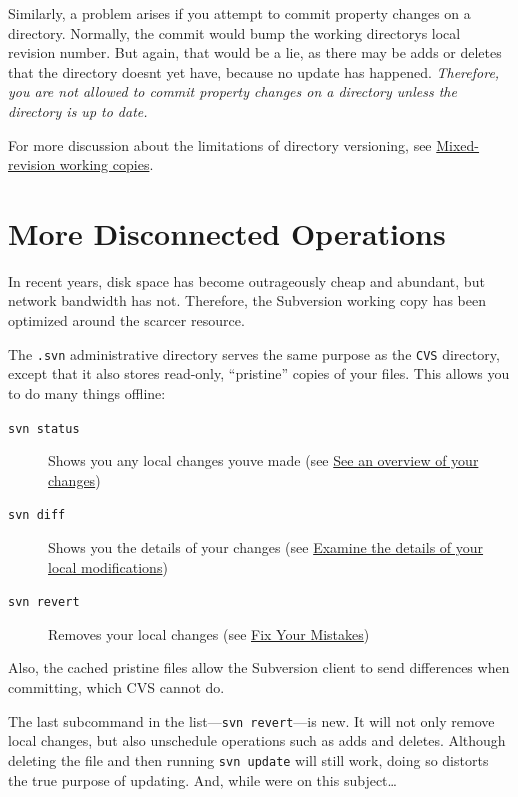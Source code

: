 Similarly, a problem arises if you attempt to commit property changes on
a directory. Normally, the commit would bump the working
directory\textquotesingle s local revision number. But again, that would
be a lie, as there may be adds or deletes that the directory
doesn\textquotesingle t yet have, because no update has happened.
\emph{Therefore, you are not allowed to commit property changes on a
directory unless the directory is up to date.}

For more discussion about the limitations of directory versioning, see
\hyperref[svn.basic.in-action.mixedrevs]{Mixed-revision working copies}.

\section{More Disconnected Operations}\label{svn.forcvs.disconnected}

In recent years, disk space has become outrageously cheap and abundant,
but network bandwidth has not. Therefore, the Subversion working copy
has been optimized around the scarcer resource.

The \texttt{.svn} administrative directory serves the same purpose as
the \texttt{CVS} directory, except that it also stores read-only,
``pristine'' copies of your files. This allows you to do many things
offline:

\begin{description}
\item[\texttt{svn\ status}]
Shows you any local changes you\textquotesingle ve made (see
\hyperref[svn.tour.cycle.examine.status]{See an overview of your
changes})
\item[\texttt{svn\ diff}]
Shows you the details of your changes (see
\hyperref[svn.tour.cycle.examine.diff]{Examine the details of your local
modifications})
\item[\texttt{svn\ revert}]
Removes your local changes (see \hyperref[svn.tour.cycle.revert]{Fix
Your Mistakes})
\end{description}

Also, the cached pristine files allow the Subversion client to send
differences when committing, which CVS cannot do.

The last subcommand in the list---\texttt{svn\ revert}---is new. It will
not only remove local changes, but also unschedule operations such as
adds and deletes. Although deleting the file and then running
\texttt{svn\ update} will still work, doing so distorts the true purpose
of updating. And, while we\textquotesingle re on this subject\ldots{}

